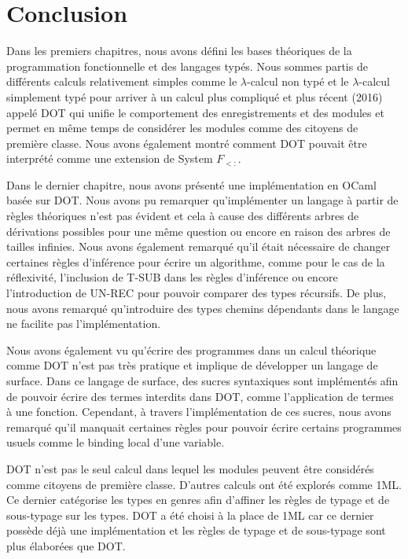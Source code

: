 \chapter*{Conclusion}

Dans les premiers chapitres, nous avons défini les bases théoriques de la
programmation fonctionnelle et des langages typés. Nous sommes partis de
différents calculs relativement simples comme le $\lambda$-calcul non typé et le
$\lambda$-calcul simplement typé pour arriver à un calcul plus compliqué et plus
récent (2016) appelé DOT qui unifie
le comportement des enregistrements et des modules et permet en même temps
de considérer les modules comme des citoyens de première classe. Nous
avons également montré comment DOT pouvait être interprété comme une extension
de System $F_{<:}$.

Dans le dernier chapitre, nous avons présenté une implémentation en OCaml basée
sur DOT. Nous avons pu remarquer qu'implémenter un langage à partir de règles
théoriques n'est pas évident et cela à cause des différents arbres de
dérivations possibles pour une même question ou encore en raison des arbres de
tailles infinies.
Nous avons également remarqué qu'il était nécessaire de changer certaines règles
d'inférence pour écrire un algorithme, comme pour le cas de la réflexivité,
l'inclusion de T-SUB dans les règles d'inférence ou encore l'introduction de
UN-REC pour pouvoir comparer des types récursifs.
De plus, nous avons remarqué qu'introduire des types chemins dépendants dans le
langage ne facilite pas l'implémentation.

Nous avons également vu qu'écrire des programmes dans un calcul théorique comme
DOT n'est pas très pratique et implique de développer un langage de surface.
Dans ce langage de surface, des sucres syntaxiques sont implémentés afin de
pouvoir écrire des termes interdits dans DOT, comme l'application de termes à
une fonction. Cependant, à travers l'implémentation de ces sucres, nous avons
remarqué qu'il manquait certaines règles pour pouvoir écrire certains programmes
usuels comme le binding local d'une variable.

DOT n'est pas le seul calcul dans lequel les modules peuvent être considérés
comme citoyens de première classe. D'autres calculs ont été explorés comme
1ML\cite{1ml-paper}. Ce dernier catégorise les types en
genres\cite{tapl-higher-order-systems} afin d'affiner les règles de typage et
de sous-typage sur les types. DOT a été choisi à la place de 1ML car ce dernier possède
déjà une implémentation et les règles de typage et de sous-typage sont plus
élaborées que DOT.

